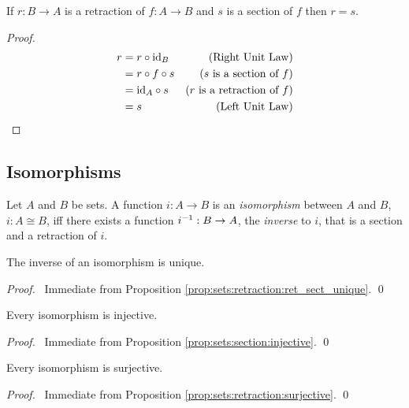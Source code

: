 \begin{prop}
\label{prop:sets:retraction:ret_sect_unique}
If $r : B \rightarrow A$ is a retraction of $f : A \rightarrow B$ and $s$ is a section of $f$  then $ r = s$.
\end{prop}

\begin{proof}
\pf
\begin{align*}
r & = r \circ \mathrm{id}_{B} & (\text{Right Unit Law}) \\
& = r \circ f \circ s & (\text{$s$ is a section of $f$}) \\
& = \mathrm{id}_{A} \circ s & (\text{$r$ is a retraction of $f$}) \\
& = s & (\text{Left Unit Law})
\end{align*}
\end{proof}

\subsection{Isomorphisms}

\begin{df}[Isomorphism]
Let $A$ and $B$ be sets. A function $i : A \rightarrow B$  is an
\emph{isomorphism} between $A$ and $B$, $i : A \cong B$, iff there exists a
function ${i}^{-1} : B \rightarrow A$, the \emph{inverse} to $i$, that is a
section and a retraction of $i$.
\end{df}

\begin{prop}
The inverse of an isomorphism is unique.
\end{prop}

\begin{proof}
\pf\ Immediate from Proposition \ref{prop:sets:retraction:ret_sect_unique}. \qed
\end{proof}

\begin{prop}
Every isomorphism is injective.
\end{prop}

\begin{proof}
\pf\ Immediate from Proposition \ref{prop:sets:section:injective}. \qed
\end{proof}

\begin{prop}
Every isomorphism is surjective.
\end{prop}

\begin{proof}
\pf\ Immediate from Proposition \ref{prop:sets:retraction:surjective}. \qed
\end{proof}


